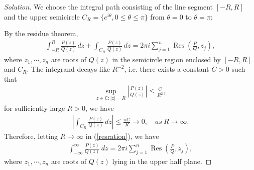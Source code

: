 \documentclass{article}
\numberwithin{equation}{section}
\newcommand{\bbC}{\mathbb{C}}
\DeclareMathOperator{\res}{Res}
\theoremstyle{plain}
\theoremstyle{definition}
\begin{document}
\begin{proof}[Solution]
We choose the integral path consisting of the line segment $[-R,R]$ and the upper semicircle $C_R=\{e^{i\theta},0\leq\theta\leq\pi\}$ from $\theta=0$ to $\theta=\pi$:
\begin{center}
\end{center}
By the residue theorem,
\begin{align}
	\int_{-R}^R\frac{P(z)}{Q(z)}\,dz+\int_{C_R}\frac{P(z)}{Q(z)}\,dz=2\pi i\sum_{j=1}^n\res\left(\frac{P}{Q},z_j\right),\label{resration}
\end{align}
where $z_1,\cdots,z_n$ are roots of $Q(z)$ in the semicircle region enclosed by $[-R,R]$ and $C_R$. The integrand decays like $R^{-2}$, i.e. there exists a constant $C>0$ such that
\begin{align*}
	\sup_{z\in\bbC:\vert z\vert=R}\left\vert\frac{P(z)}{Q(z)}\right\vert\leq\frac{C}{R^2},
\end{align*}
for sufficiently large $R>0$, we have
\begin{align*}
	\left\vert\int_{C_R}\frac{P(z)}{Q(z)}\,dz\right\vert\leq\frac{\pi C}{R}\to 0,\quad as\ R\to\infty.
\end{align*}
Therefore, letting $R\to\infty$ in (\ref{resration}), we have
\begin{align*}
	\int_{-\infty}^\infty\frac{P(z)}{Q(z)}\,dz=2\pi i\sum_{j=1}^n\res\left(\frac{P}{Q},z_j\right),
\end{align*}
where $z_1,\cdots,z_n$ are roots of $Q(z)$ lying in the upper half plane.
\end{proof}
\end{document}
